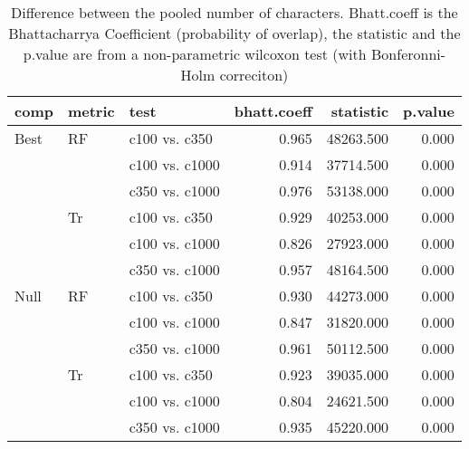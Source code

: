 \begin{table}[ht]
\centering
\begin{tabular}{lllrrr}
  \hline
comp & metric & test & bhatt.coeff & statistic & p.value \\ 
  \hline
Best & RF & c100 vs. c350 & 0.965 & 48263.500 & 0.000 \\ 
   &  & c100 vs. c1000 & 0.914 & 37714.500 & 0.000 \\ 
   &  & c350 vs. c1000 & 0.976 & 53138.000 & 0.000 \\ 
   & Tr & c100 vs. c350 & 0.929 & 40253.000 & 0.000 \\ 
   &  & c100 vs. c1000 & 0.826 & 27923.000 & 0.000 \\ 
   &  & c350 vs. c1000 & 0.957 & 48164.500 & 0.000 \\ 
  Null & RF & c100 vs. c350 & 0.930 & 44273.000 & 0.000 \\ 
   &  & c100 vs. c1000 & 0.847 & 31820.000 & 0.000 \\ 
   &  & c350 vs. c1000 & 0.961 & 50112.500 & 0.000 \\ 
   & Tr & c100 vs. c350 & 0.923 & 39035.000 & 0.000 \\ 
   &  & c100 vs. c1000 & 0.804 & 24621.500 & 0.000 \\ 
   &  & c350 vs. c1000 & 0.935 & 45220.000 & 0.000 \\ 
   \hline
\end{tabular}
\caption{Difference between the pooled number of characters. Bhatt.coeff is the Bhattacharrya Coefficient (probability of overlap), the statistic and the p.value are from a non-parametric wilcoxon test (with Bonferonni-Holm correciton)} 
\label{Full_Tab_pooledscharacters_test}
\end{table}
